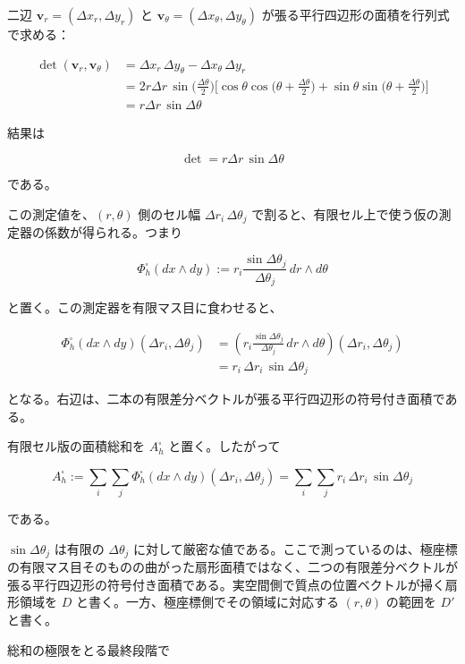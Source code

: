 \documentclass[a4paper,12pt,openany]{book}
\begin{document}
二辺 \(\mathbf{v}_r = (\Delta x_r, \Delta y_r)\) と
\(\mathbf{v}_\theta = (\Delta x_\theta, \Delta y_\theta)\)
が張る平行四辺形の面積を行列式で求める：

\[\begin{aligned}
\det(\mathbf{v}_r,\mathbf{v}_\theta) &= \Delta x_r\,\Delta y_\theta - \Delta x_\theta\,\Delta y_r \\
&= 2r\Delta r\,\sin\biggl(\frac{\Delta\theta}{2}\biggr)\biggl[ \cos\theta\cos\biggl(\theta+\frac{\Delta\theta}{2}\biggr) + \sin\theta\sin\biggl(\theta+\frac{\Delta\theta}{2}\biggr) \biggr] \\
&= r\Delta r\,\sin\Delta\theta
\end{aligned}\]

結果は

\[\det = r\Delta r\,\sin\Delta\theta\]

である。

この測定値を、\((r,\theta)\) 側のセル幅 \(\Delta r_i\,\Delta\theta_j\)
で割ると、有限セル上で使う仮の測定器の係数が得られる。つまり

\[
\Phi_h^\square(dx\wedge dy)
:=
r_i\frac{\sin\Delta\theta_j}{\Delta\theta_j}\,dr\wedge d\theta
\]

と置く。この測定器を有限マス目に食わせると、

\[
\begin{aligned}
\Phi_h^\square(dx\wedge dy)(\Delta r_i,\Delta\theta_j)
&=
\left(
r_i\frac{\sin\Delta\theta_j}{\Delta\theta_j}\,dr\wedge d\theta
\right)(\Delta r_i,\Delta\theta_j) \\
&=
r_i\,\Delta r_i\,\sin\Delta\theta_j
\end{aligned}
\]

となる。右辺は、二本の有限差分ベクトルが張る平行四辺形の符号付き面積である。

有限セル版の面積総和を \(A_h^\square\) と置く。したがって

\[
A_h^\square
:=
\sum_i\sum_j
\Phi_h^\square(dx\wedge dy)(\Delta r_i,\Delta\theta_j)
=
\sum_i\sum_j r_i\,\Delta r_i\,\sin\Delta\theta_j
\]

である。

\(\sin\Delta\theta_j\) は有限の \(\Delta\theta_j\)
に対して厳密な値である。ここで測っているのは、極座標の有限マス目そのものの曲がった扇形面積ではなく、二つの有限差分ベクトルが張る平行四辺形の符号付き面積である。実空間側で質点の位置ベクトルが掃く扇形領域を
\(D\) と書く。一方、極座標側でその領域に対応する \((r,\theta)\) の範囲を
\(D'\) と書く。

総和の極限をとる最終段階で
\end{document}
